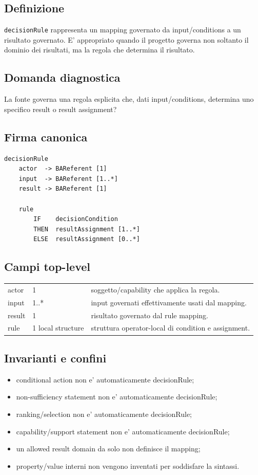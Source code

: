 \documentclass[11pt,a4paper]{article}
\begin{document}
\subsection{Definizione}
\texttt{decisionRule} rappresenta un mapping governato da input/conditions a un risultato governato. E' appropriato quando il progetto governa non soltanto il dominio dei risultati, ma la regola che determina il risultato.

\subsection{Domanda diagnostica}
La fonte governa una regola esplicita che, dati input/conditions, determina uno specifico result o result assignment?

\subsection{Firma canonica}
\begin{lstlisting}
decisionRule
    actor  -> BAReferent [1]
    input  -> BAReferent [1..*]
    result -> BAReferent [1]

    rule
        IF    decisionCondition
        THEN  resultAssignment [1..*]
        ELSE  resultAssignment [0..*]
\end{lstlisting}

\subsection{Campi top-level}
\begin{tabularx}{\textwidth}{L{36mm}L{24mm}Y}
\toprule
actor & 1 & soggetto/capability che applica la regola. \\
input & 1..* & input governati effettivamente usati dal mapping. \\
result & 1 & risultato governato dal rule mapping. \\
rule & 1 local structure & struttura operator-local di condition e assignment. \\
\bottomrule
\end{tabularx}

\subsection{Invarianti e confini}
\begin{itemize}
  \item conditional action non e' automaticamente decisionRule;
  \item non-sufficiency statement non e' automaticamente decisionRule;
  \item ranking/selection non e' automaticamente decisionRule;
  \item capability/support statement non e' automaticamente decisionRule;
  \item un allowed result domain da solo non definisce il mapping;
  \item property/value interni non vengono inventati per soddisfare la sintassi.
\end{itemize}
\end{document}
